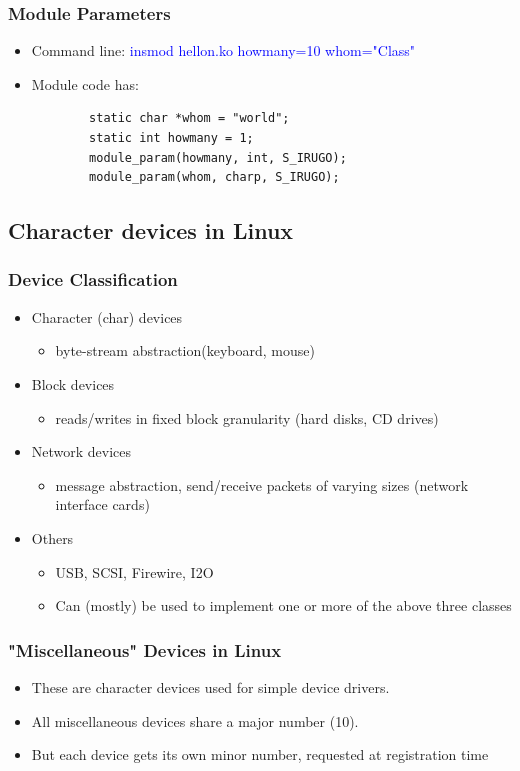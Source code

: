 \documentclass[12pt]{article}
\begin{document}
\subsubsection{Module Parameters}
\begin{itemize}
    \item Command line: \textcolor{blue}{insmod hellon.ko howmany=10 whom="Class"}
    \item Module code has: \begin{lstlisting}
        static char *whom = "world";
        static int howmany = 1;
        module_param(howmany, int, S_IRUGO);
        module_param(whom, charp, S_IRUGO);
    \end{lstlisting}
\end{itemize}
\subsection{Character devices in Linux}
\subsubsection{Device Classification}
\begin{itemize}
    \item Character (char) devices \begin{itemize}
        \item byte-stream abstraction(keyboard, mouse)
    \end{itemize}
    \item Block devices \begin{itemize}
        \item reads/writes in fixed block granularity (hard disks, CD drives)
    \end{itemize}
    \item Network devices \begin{itemize}
        \item message abstraction, send/receive packets of varying sizes (network interface cards)
    \end{itemize}
    \item Others \begin{itemize}
        \item USB, SCSI, Firewire, I2O
        \item Can (mostly) be used to implement one or more of the above three classes
    \end{itemize}
\end{itemize}
\subsubsection{"Miscellaneous" Devices in Linux}
\begin{itemize}
    \item These are character devices used for simple device drivers. 
    \item All miscellaneous devices share a major number (10). 
    \item But each device gets its own minor number, requested at registration time
\end{itemize}
\end{document}
